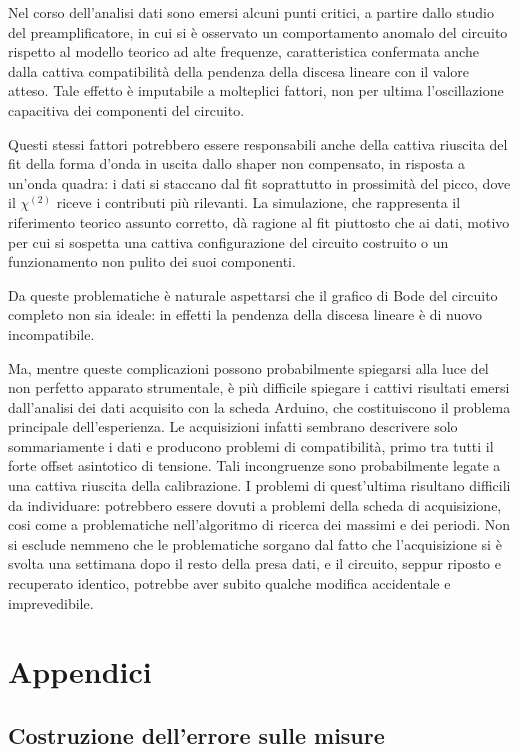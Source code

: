 \documentclass{article}
\begin{document}
Nel corso dell'analisi dati sono emersi alcuni punti critici, a partire dallo studio del preamplificatore, in cui si è osservato un comportamento anomalo del circuito
rispetto al modello teorico ad alte frequenze, caratteristica confermata anche dalla cattiva compatibilità della pendenza della discesa lineare con il valore atteso.
Tale effetto è imputabile a molteplici fattori, non per ultima l'oscillazione capacitiva dei componenti del circuito.

Questi stessi fattori potrebbero essere responsabili anche della cattiva riuscita del fit della forma d'onda in uscita dallo shaper non compensato, in risposta a
un'onda quadra: i dati si staccano dal fit soprattutto in prossimità del picco, dove il $\chi^{(2)}$ riceve i contributi più rilevanti. La simulazione, che rappresenta
il riferimento teorico assunto corretto, dà ragione al fit piuttosto che ai dati, motivo per cui si sospetta una cattiva configurazione del circuito costruito o un
funzionamento non pulito dei suoi componenti.

Da queste problematiche è naturale aspettarsi che il grafico di Bode del circuito completo non sia ideale: in effetti la pendenza della discesa lineare è di nuovo
incompatibile.

Ma, mentre queste complicazioni possono probabilmente spiegarsi alla luce del non perfetto apparato strumentale, è più difficile spiegare i cattivi risultati emersi 
dall'analisi dei dati acquisito con la scheda Arduino, che costituiscono il problema principale dell'esperienza. 
Le acquisizioni infatti sembrano descrivere solo sommariamente i dati e producono problemi di compatibilità, primo tra tutti il forte offset asintotico di tensione. 
Tali incongruenze sono probabilmente legate a una cattiva riuscita della calibrazione. I problemi di quest'ultima risultano 
difficili da individuare: potrebbero essere dovuti a problemi della scheda di acquisizione, cosi come a problematiche nell'algoritmo di ricerca dei massimi e dei periodi.
Non si esclude nemmeno che le problematiche sorgano dal fatto che l'acquisizione si è 
svolta una settimana dopo il resto della presa dati, e il circuito, seppur riposto e recuperato identico, potrebbe aver subito qualche modifica accidentale e 
imprevedibile.



\newpage
\appendix
\section{Appendici}
\label{appendice}
\subsection{Costruzione dell'errore sulle misure}
\label{Calcerr}
\end{document}
